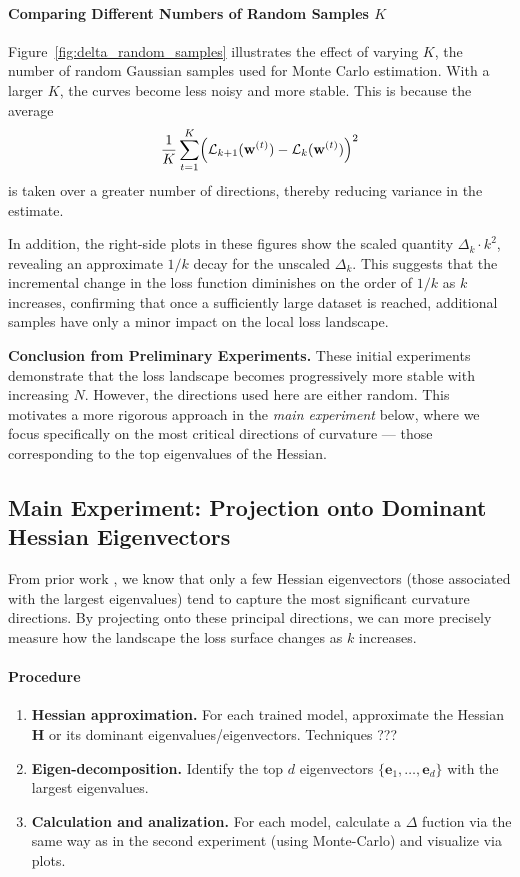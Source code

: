 \documentclass{article}
\begin{document}
\paragraph{Comparing Different Numbers of Random Samples \texorpdfstring{$K$}{K}}
Figure~\ref{fig:delta_random_samples} illustrates the effect of varying $K$, the number of random Gaussian samples used for Monte Carlo 
estimation. With a larger $K$, the curves become less noisy and more stable. This is because the average
$$\frac{1}{K} \sum_{t=1}^{K} \Bigl(\mathcal{L}_{k+1}(\mathbf{w}^{(t)}) - \mathcal{L}_k(\mathbf{w}^{(t)})\Bigr)^2$$
is taken over a greater number of directions, thereby reducing variance in the estimate. 

In addition, the right-side plots in these figures show the scaled quantity $\Delta_k \cdot k^2$, revealing an approximate $1/k$ decay 
for the unscaled $\Delta_k$. This suggests that the incremental change in the loss function diminishes on the order of $1/k$ as $k$ 
increases, confirming that once a sufficiently large dataset is reached, additional samples have only a minor impact on the local loss 
landscape.

\noindent
\textbf{Conclusion from Preliminary Experiments.}
These initial experiments demonstrate that the loss landscape becomes progressively more stable with increasing $N$.
However, the directions used here are either random. This motivates a more rigorous approach in the \emph{main experiment}
below, where we focus specifically on the most critical directions of curvature --- those corresponding to the top
eigenvalues of the Hessian.

\subsection{Main Experiment: Projection onto Dominant Hessian Eigenvectors}

From prior work \cite{sagun2018empirical}, we know that only a few Hessian eigenvectors (those associated with the largest
eigenvalues) tend to capture the most significant curvature directions. By projecting onto these principal directions,
we can more precisely measure how the landscape the loss surface changes as $k$ increases.

\paragraph{Procedure}
\begin{enumerate}
  \item \textbf{Hessian approximation.} For each trained model, approximate
        the Hessian $\mathbf{H}$ or its dominant eigenvalues/eigenvectors. Techniques ???
  \item \textbf{Eigen-decomposition.} Identify the top $d$ eigenvectors $\{\mathbf{e}_1, \dots, \mathbf{e}_d\}$ with the
        largest eigenvalues.
  \item \textbf{Calculation and analization.} For each model, calculate a $\Delta$ fuction via the same way as in the second
        experiment (using Monte-Carlo) and visualize via plots.
\end{enumerate}
\end{document}
